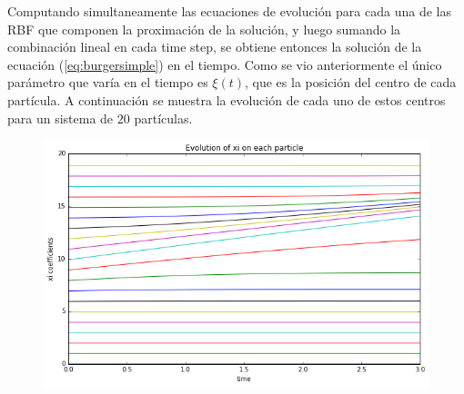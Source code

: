 \documentclass[spanish, fleqn]{article}
\begin{document}
    Computando simultaneamente las ecuaciones de evolución para cada una de las RBF que componen la proximación de la solución, y luego sumando la combinación lineal en cada time step, se obtiene entonces la solución de la ecuación (\ref{eq:burgersimple}) en el tiempo. Como se vio anteriormente el único parámetro que varía en el tiempo es $\xi(t)$, que es la posición del centro de cada partícula. A continuación se muestra la evolución de cada uno de estos centros para un sistema de $20$ partículas.
    \begin{figure}
      \centering
      \includegraphics[scale=0.5]{xis.png}
    \end{figure}
    
\end{document}
